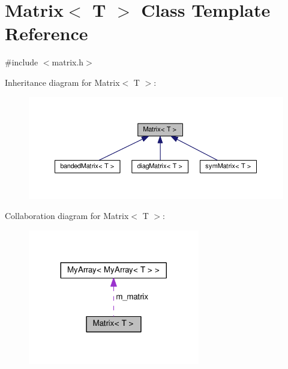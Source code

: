 \hypertarget{classMatrix}{}\section{Matrix$<$ T $>$ Class Template Reference}
\label{classMatrix}


{\ttfamily \#include $<$matrix.\+h$>$}



Inheritance diagram for Matrix$<$ T $>$\+:\nopagebreak
\begin{figure}[H]
\begin{center}
\leavevmode
\includegraphics[width=350pt]{classMatrix__inherit__graph}
\end{center}
\end{figure}


Collaboration diagram for Matrix$<$ T $>$\+:\nopagebreak
\begin{figure}[H]
\begin{center}
\leavevmode
\includegraphics[width=212pt]{classMatrix__coll__graph}
\end{center}
\end{figure}
